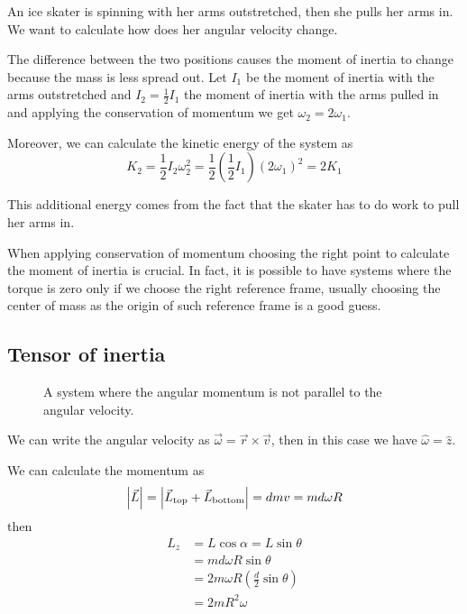 \documentclass[12pt]{extarticle}
\begin{document}
\begin{example}
    An ice skater is spinning with her arms outstretched, then she pulls her arms in.
    We want to calculate how does her angular velocity change.

    The difference between the two positions causes the moment of inertia to change because the mass is less spread out.
    Let $I_1$ be the moment of inertia with the arms outstretched and $I_2 = \frac{1}{2} I_1$ the moment of inertia with the arms pulled in and applying the conservation of momentum we get $\omega_2 = 2 \omega_1$.

    Moreover, we can calculate the kinetic energy of the system as
    \begin{equation}
        K_2 = \frac{1}{2} I_2 \omega_2^2 = \frac{1}{2} \left(\frac{1}{2} I_1\right) (2 \omega_1)^2 = 2 K_1
    \end{equation}

    This additional energy comes from the fact that the skater has to do work to pull her arms in.
\end{example}

When applying conservation of momentum choosing the right point to calculate the moment of inertia is crucial.
In fact, it is possible to have systems where the torque is zero only if we choose the right reference frame, usually choosing the center of mass as the origin of such reference frame is a good guess.


\subsection{Tensor of inertia}

\begin{figure}[H]
    \centering
    
    \caption{A system where the angular momentum is not parallel to the angular velocity.}
    \label{fig:tensor-of-inertia}
\end{figure}

We can write the angular velocity as $\vec{\omega} = \vec{r} \times \vec{v}$, then in this case we have $\hat \omega = \hat z$.

We can calculate the momentum as
\begin{equation}
    \abs{\vec L} = \abs{\vec{L}_{\text{top}} + \vec{L}_{\text{bottom}}} = dmv = md\omega R
\end{equation}
then
\begin{align}
    L_z & = L \cos \alpha = L \sin \theta                       \\
        & = md\omega R \sin \theta                              \\
        & = 2 m \omega R \left( \frac{d}{2} \sin \theta \right) \\
        & = 2m R^2 \omega
\end{align}
\end{document}
